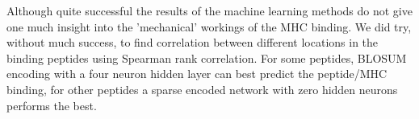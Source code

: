 Although quite successful the results of the machine learning methods do not give one much insight into the 'mechanical' workings of the MHC binding.
We did try, without much success, to find correlation between different locations in the binding peptides using Spearman rank correlation.
For some peptides, BLOSUM encoding with a four
neuron hidden layer can best predict the
peptide/MHC binding, for other peptides a sparse
encoded network with zero hidden neurons performs
the best.
